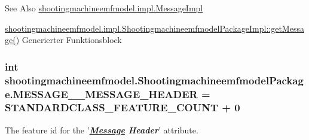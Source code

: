 \begin{DoxySeeAlso}{See Also}
\hyperlink{classshootingmachineemfmodel_1_1impl_1_1_message_impl}{shootingmachineemfmodel.\-impl.\-Message\-Impl} 

\hyperlink{classshootingmachineemfmodel_1_1impl_1_1_shootingmachineemfmodel_package_impl_ac5110626e0726dd7b9161fc57637d468}{shootingmachineemfmodel.\-impl.\-Shootingmachineemfmodel\-Package\-Impl\-::get\-Message()} Generierter Funktionsblock 
\end{DoxySeeAlso}
\hypertarget{interfaceshootingmachineemfmodel_1_1_shootingmachineemfmodel_package_a128890f7aa05acf3d43a605af26d154b}{
\subsubsection[{M\-E\-S\-S\-A\-G\-E\-\_\-\-\_\-\-M\-E\-S\-S\-A\-G\-E\-\_\-\-H\-E\-A\-D\-E\-R}]{\setlength{\rightskip}{0pt plus 5cm}int shootingmachineemfmodel.\-Shootingmachineemfmodel\-Package.\-M\-E\-S\-S\-A\-G\-E\-\_\-\-\_\-\-M\-E\-S\-S\-A\-G\-E\-\_\-\-H\-E\-A\-D\-E\-R = {\bf S\-T\-A\-N\-D\-A\-R\-D\-C\-L\-A\-S\-S\-\_\-\-F\-E\-A\-T\-U\-R\-E\-\_\-\-C\-O\-U\-N\-T} + 0}}\label{interfaceshootingmachineemfmodel_1_1_shootingmachineemfmodel_package_a128890f7aa05acf3d43a605af26d154b}
The feature id for the '{\itshape {\bfseries \hyperlink{interfaceshootingmachineemfmodel_1_1_message}{Message} Header}}' attribute.

